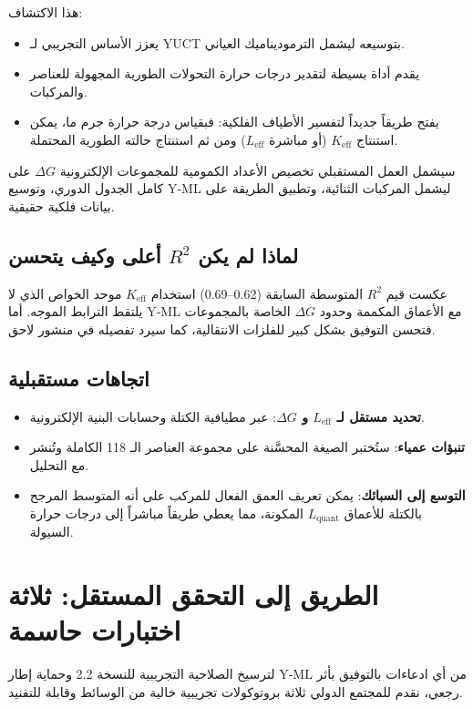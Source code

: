 \documentclass[11pt,a4paper]{article}
\newcommand{\Keff}{K_{\mathrm{eff}}}
\begin{document}
	هذا الاكتشاف:
	\begin{itemize}
		\item يعزز الأساس التجريبي لـ YUCT بتوسيعه ليشمل الترموديناميك العياني.
		\item يقدم أداة بسيطة لتقدير درجات حرارة التحولات الطورية المجهولة للعناصر والمركبات.
		\item يفتح طريقاً جديداً لتفسير الأطياف الفلكية: فبقياس درجة حرارة جرم ما، يمكن استنتاج \(\Keff\) (أو مباشرة \(L_{\mathrm{eff}}\)) ومن ثم استنتاج حالته الطورية المحتملة.
	\end{itemize}
	سيشمل العمل المستقبلي تخصيص الأعداد الكمومية للمجموعات الإلكترونية \(\Delta G\) على كامل الجدول الدوري، وتوسيع Y‑ML ليشمل المركبات الثنائية، وتطبيق الطريقة على بيانات فلكية حقيقية.
	
	\subsection{لماذا لم يكن \(R^2\) أعلى وكيف يتحسن}
	عكست قيم \(R^2\) المتوسطة السابقة (0.62–0.69) استخدام \(K_{\mathrm{eff}}\) موحد الخواص الذي لا يلتقط الترابط الموجه. أما Y‑ML مع الأعماق المكممة وحدود \(\Delta G\) الخاصة بالمجموعات فتحسن التوفيق بشكل كبير للفلزات الانتقالية، كما سيرد تفصيله في منشور لاحق.
	
	\subsection{اتجاهات مستقبلية}
	\begin{itemize}
		\item \textbf{تحديد مستقل لـ \(L_{\mathrm{eff}}\) و \(\Delta G\)}: عبر مطيافية الكتلة وحسابات البنية الإلكترونية.
		\item \textbf{تنبؤات عمياء}: ستُختبر الصيغة المحسَّنة على مجموعة العناصر الـ 118 الكاملة وتُنشر مع التحليل.
		\item \textbf{التوسع إلى السبائك}: يمكن تعريف العمق الفعال للمركب على أنه المتوسط المرجح بالكتلة للأعماق \(L_{\mathrm{quant}}\) المكونة، مما يعطي طريقاً مباشراً إلى درجات حرارة السيولة.
	\end{itemize}
	
	\section{الطريق إلى التحقق المستقل: ثلاثة اختبارات حاسمة}
	\label{sec:decisive_tests}
	
	لترسيخ الصلاحية التجريبية للنسخة 2.2 وحماية إطار Y‑ML من أي ادعاءات بالتوفيق بأثر رجعي، نقدم للمجتمع الدولي ثلاثة بروتوكولات تجريبية خالية من الوسائط وقابلة للتفنيد.
	
\end{document}

